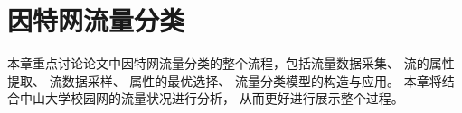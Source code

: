 ﻿\chapter{因特网流量分类}

本章重点讨论论文中因特网流量分类的整个流程，包括流量数据采集、
流的属性提取、 流数据采样、 属性的最优选择、
流量分类模型的构造与应用。
本章将结合中山大学校园网的流量状况进行分析，
从而更好进行展示整个过程。
